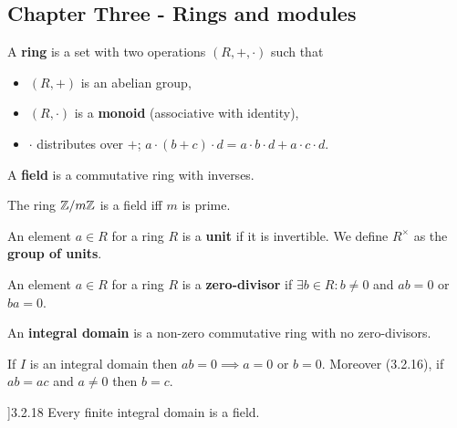 \newpage%
\begin{multicols}{2}
\section*{Chapter Three - Rings and modules}

\begin{definition}
A \textbf{ring} is a set with two operations $(R,+,\cdot)$ such that
\begin{itemize}
    \item $(R,+)$ is an abelian group,
    \item $(R,\cdot)$ is a \textbf{monoid} (associative with identity),
    \item $\cdot$ distributes over $+$; $a\cdot(b+c)\cdot d=a\cdot b\cdot d+a\cdot c\cdot d$.
\end{itemize}
\end{definition}

\begin{definition}
A \textbf{field} is a commutative ring with inverses.
\end{definition}

\begin{theorem}[3.1.11]
The ring $\mathbb{Z}/m\mathbb{Z}$ is a field iff $m$ is prime.
\end{theorem}

\begin{definition}
An element $a\in R$ for a ring $R$ is a \textbf{unit} if it is invertible. We define $R^\times$ as the \textbf{group of units}.
\end{definition}

\begin{definition}
An element $a\in R$ for a ring $R$ is a \textbf{zero-divisor} if $\exists b\in R: b\neq0$ and $ab=0$ or $ba=0$.
\end{definition}

\begin{definition}
An \textbf{integral domain} is a non-zero commutative ring with no zero-divisors.
\end{definition}

\begin{theorem}
If $I$ is an integral domain then $ab=0\implies a=0$ or $b=0$. Moreover (3.2.16), if $ab=ac$ and $a\neq0$ then $b=c$.
\end{theorem}

\begin{theorem}]3.2.18
Every finite integral domain is a field.
\end{theorem}


\end{multicols}
